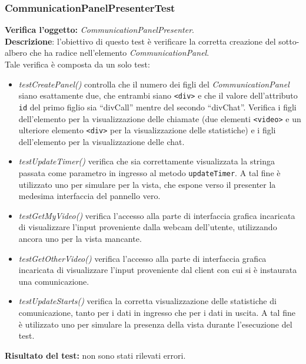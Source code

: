 \subsubsection{CommunicationPanelPresenterTest}
\textbf{Verifica l'oggetto:} \textit{CommunicationPanelPresenter}.\\
\textbf{Descrizione}: l'obiettivo di questo test è verificare la corretta creazione del sotto-albero che ha radice nell'elemento \textit{CommunicationPanel}.\\
Tale verifica è composta da un solo test:
\begin{itemize}
\item \textit{testCreatePanel()} controlla che il numero dei figli del \textit{CommunicationPanel} siano esattamente due, che entrambi siano \texttt{<div>} e che il valore dell'attributo \texttt{id} del primo figlio sia ``divCall'' mentre del secondo ``divChat''. Verifica i figli dell'elemento per la visualizzazione delle chiamate (due elementi \texttt{<video>} e un ulteriore elemento \texttt{<div>} per la visualizzazione delle statistiche) e i figli dell'elemento per la visualizzazione delle chat.
\item \textit{testUpdateTimer()} verifica che sia correttamente visualizzata la stringa passata come parametro in ingresso al metodo \texttt{updateTimer}. A tal fine è utilizzato uno  per simulare per la vista, che espone verso il presenter la medesima interfaccia del pannello vero.
\item \textit{testGetMyVideo()} verifica l'accesso alla parte di interfaccia grafica incaricata di visualizzare l'input proveniente dalla webcam dell'utente, utilizzando ancora uno  per la vista mancante.
\item \textit{testGetOtherVideo()} verifica l'accesso alla parte di interfaccia grafica incaricata di visualizzare l'input proveniente dal client con cui si è instaurata una comunicazione.
\item \textit{testUpdateStarts()} verifica la corretta visualizzazione delle statistiche di comunicazione, tanto per i dati in ingresso che per i dati in uscita. A tal fine è utilizzato uno  per simulare la presenza della vista durante l'esecuzione del test.
\end{itemize}
\textbf{Risultato del test:} non sono stati rilevati errori.

